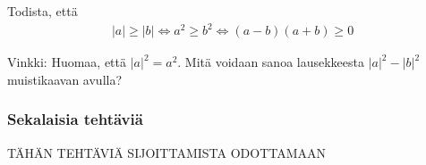\begin{tehtavasivu}
\begin{tehtava}
	Todista, että
	\begin{align*}
		|a| \geq |b| \Leftrightarrow a^2 \geq b^2 \Leftrightarrow (a-b)(a+b) \geq 0
	\end{align*}
	\begin{vastaus}
		Vinkki: Huomaa, että $|a|^2 = a^2$. Mitä voidaan sanoa lausekkeesta $|a|^2-|b|^2$ muistikaavan avulla?
	\end{vastaus}
\end{tehtava}

\subsubsection*{Sekalaisia tehtäviä}

TÄHÄN TEHTÄVIÄ SIJOITTAMISTA ODOTTAMAAN





\end{tehtavasivu}
